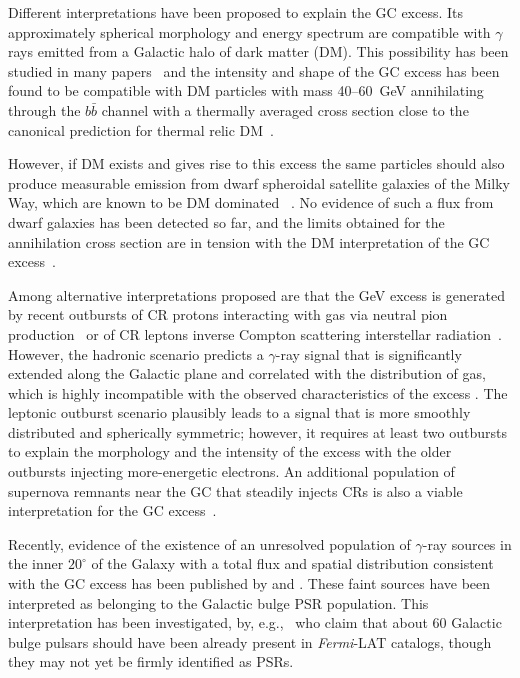 \documentclass[iop]{emulateapj}
\begin{document}
Different interpretations have been proposed to explain the GC excess.  
Its approximately spherical morphology
and energy spectrum are compatible with $\gamma$ rays emitted from a
Galactic halo of dark matter (DM).  This possibility has been studied
in many papers~\citep[e.g.,][]{2009arXiv0910.2998G,Abazajian:2014fta,Calore:2014xka,2016PDU....12....1D} and
the intensity and shape of the GC excess has been found to be
compatible with DM particles with mass 40--60~GeV annihilating
through the $b\bar{b}$ channel with a thermally averaged cross section close to the
canonical prediction for thermal relic DM~\citep[roughly $3\times10^{-26} {\rm cm}^3
{\rm s}^{-1}$, e.g.,][]{Steigman:2012nb}.

However, if DM exists and gives rise to this excess the same particles
should also produce measurable emission from dwarf spheroidal
satellite galaxies of the Milky Way, which are known to be DM
dominated ~\citep{2008Natur.454.1096S}. 
No evidence of such a flux from dwarf galaxies has been
detected so far, and the limits obtained for the annihilation cross
section are in tension with the DM interpretation of the GC
excess~\citep[see][and references therein]{2017ApJ...834..110A}.

Among alternative interpretations proposed are that the GeV excess is
generated by recent outbursts of CR protons interacting with gas via
neutral pion production~\citep{Carlson:2014cwa} or of CR leptons
inverse Compton scattering interstellar
radiation~\citep{Petrovic:2014uda,Cholis:2015dea,Gaggero:2015nsa}.
However, the hadronic scenario predicts a $\gamma$-ray signal that is
significantly extended along the Galactic plane and correlated with
the distribution of gas, which is highly incompatible with the
observed characteristics of the excess \citep{Petrovic:2014uda}.  The
leptonic outburst scenario plausibly leads to a signal that is more
smoothly distributed and spherically symmetric; however, it requires
at least two outbursts to explain the morphology and the intensity of
the excess with the older outbursts injecting more-energetic
electrons. An additional population of supernova remnants near the GC
that steadily injects CRs is also a viable interpretation for the GC
excess~\citep{Gaggero:2015nsa,Carlson:2015ona}.



Recently, evidence of the existence of an unresolved population of
$\gamma$-ray sources in the inner $20^\circ$ of the Galaxy with a
total flux and spatial distribution consistent with the GC excess has
been published by \citet{Lee:2014mza} and \citet{Bartels:2015aea}. These faint
sources have been interpreted as belonging to the Galactic bulge PSR population.  
This interpretation has been investigated, by, e.g.,~\citet{Cholis:2014lta}
who claim that about 60 Galactic bulge pulsars should have been
already present in {\it Fermi}-LAT catalogs, though they may not
yet be firmly identified as PSRs.
\end{document}
